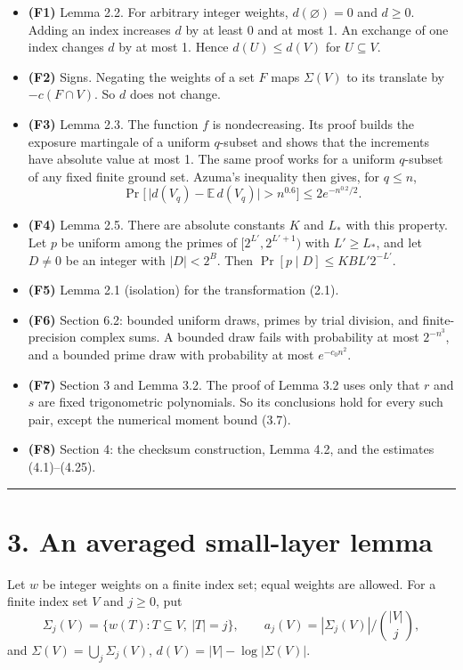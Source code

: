 \documentclass[10pt,a4paper]{article}
\begin{document}
\begin{itemize}
\item \textbf{(F1)} Lemma 2.2. For arbitrary integer weights, $d(\varnothing) = 0$ and $d \ge 0$. Adding an index increases $d$
by at least 0 and at most 1. An exchange of one index changes $d$ by at most 1. Hence $d(U) \le d(V)$ for
$U \subseteq V$.
\item \textbf{(F2)} Signs. Negating the weights of a set $F$ maps $\Sigma(V)$ to its translate by $-c(F \cap V)$. So $d$ does
not change.
\item \textbf{(F3)} Lemma 2.3. The function $f$ is nondecreasing. Its proof builds the exposure martingale of a uniform
$q$-subset and shows that the increments have absolute value at most 1. The same proof works for a uniform $q$-subset
of any fixed finite ground set. Azuma's inequality then gives, for $q \le n$,
\[\Pr\big[\,\lvert d(V_q) - \mathbb E\,d(V_q)\rvert > n^{0.6}\big] \le 2e^{-n^{0.2}/2}.\]
\item \textbf{(F4)} Lemma 2.5. There are absolute constants $K$ and $L_*$ with this property. Let $p$ be uniform among the
primes of $[2^{L'}, 2^{L'+1})$ with $L' \ge L_*$, and let $D \ne 0$ be an integer with $|D| < 2^B$. Then
$\Pr[p \mid D] \le KBL'2^{-L'}$.
\item \textbf{(F5)} Lemma 2.1 (isolation) for the transformation (2.1).
\item \textbf{(F6)} Section 6.2: bounded uniform draws, primes by trial division, and finite-precision complex sums. A bounded
draw fails with probability at most $2^{-n^3}$, and a bounded prime draw with probability at most $e^{-c_0n^2}$.
\item \textbf{(F7)} Section 3 and Lemma 3.2. The proof of Lemma 3.2 uses only that $r$ and $s$ are fixed trigonometric
polynomials. So its conclusions hold for every such pair, except the numerical moment bound (3.7).
\item \textbf{(F8)} Section 4: the checksum construction, Lemma 4.2, and the estimates (4.1)--(4.25).
\end{itemize}

\medskip\noindent\rule{\linewidth}{0.4pt}\medskip

\section*{3. An averaged small-layer lemma}

Let $w$ be integer weights on a finite index set; equal weights are allowed. For a finite index set $V$ and $j \ge 0$,
put
\[\Sigma_j(V) = \{w(T) : T \subseteq V,\ |T| = j\},\qquad a_j(V) = |\Sigma_j(V)|\Big/\binom{|V|}{j},\]
and $\Sigma(V) = \bigcup_j\Sigma_j(V)$, $d(V) = |V| - \log|\Sigma(V)|$.
\end{document}
